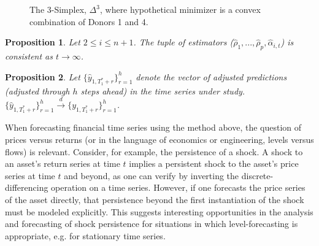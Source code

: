 \documentclass[11pt]{article}
\newtheorem{prop}{Proposition}
\theoremstyle{definition}
\begin{document}
\begin{figure}
\centering
{}
\caption{The 3-Simplex, $\Delta^{3}$, where hypothetical minimizer is a convex combination of Donors 1 and 4.}
\end{figure}


\begin{prop}\label{ARIMA_param_consistency}
Let $2\leq i \leq n+1$.  The tuple of estimators ($\hat\rho_{1},...,\hat\rho_{p}, \hat\alpha_{i,t}$) is consistent as $t \rightarrow \infty$.
\end{prop}

\begin{prop}\label{ARIMA_conv_distribution}
  Let $\{\hat y_{1,T_{1}^{*}+r}\}^{h}_{r=1}$ denote the vector of adjusted predictions (adjusted through $h$ steps ahead) in the time series under study.  $\{\hat y_{1,T_{1}^{*}+r}\}^{h}_{r=1} \xrightarrow{d} \{ y_{1,T_{1}^{*}+r}\}^{h}_{r=1}$.
  \end{prop}

When forecasting financial time series using the method above, the question of prices versus returns (or in the language of economics or engineering, levels versus flows) is relevant.  Consider, for example, the persistence of a shock.  A shock to an asset's return series at time $t$ implies a persistent shock to the asset's price series at time $t$ and beyond, as one can verify by inverting the discrete-differencing operation on a time series.  However, if one forecasts the price series of the asset directly, that persistence beyond the first instantiation of the shock must be modeled explicitly.  This suggests interesting opportunities in the analysis and forecasting of shock persistence for situations in which level-forecasting is appropriate, e.g. for stationary time series.
\end{document}
